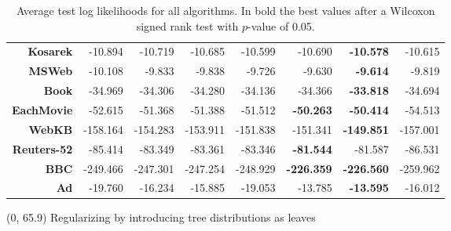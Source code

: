 \documentclass[final]{beamer}
\begin{document}
\begin{frame}{}
\begin{textblock}{25.2}
\begin{table}[!htbp]
\begin{tabular}{r r r r r r r r}
          \textbf{Kosarek}    & -10.894           & -10.719        & -10.685         & -10.599          & -10.690           & \textbf{-10.578}  & -10.615          \\
          \textbf{MSWeb}      & -10.108           & -9.833         & -9.838          & -9.726           & -9.630            & \textbf{-9.614}   & -9.819           \\
          \textbf{Book}       & -34.969           & -34.306        & -34.280         & -34.136          & -34.366           & \textbf{-33.818}  & -34.694          \\
          \textbf{EachMovie}  & -52.615           & -51.368        & -51.388         & -51.512          & \textbf{-50.263}  & \textbf{-50.414}  & -54.513          \\
          \textbf{WebKB}      & -158.164          & -154.283       & -153.911        & -151.838         & -151.341          & \textbf{-149.851} & -157.001         \\
          \textbf{Reuters-52} & -85.414           & -83.349        & -83.361         & -83.346          & \textbf{-81.544}  & -81.587           & -86.531          \\
          \textbf{BBC}        & -249.466          & -247.301       & -247.254        & -248.929         & \textbf{-226.359} & \textbf{-226.560} & -259.962         \\
          \textbf{Ad}         & -19.760           & -16.234        & -15.885         & -19.053          & -13.785           & \textbf{-13.595}  & -16.012          \\
          \bottomrule
        \end{tabular}
        \caption[Experimentation results]{\scriptsize Average test
          log likelihoods for all algorithms. In bold the best values
          after a Wilcoxon signed rank test with $p$-value of 0.05.}
        \label{tab:resexp}
      \end{table}   



      
      \end{textblock}


        
  \begin{textblock}{80}(0, 65.9)
    Regularizing by introducing tree distributions as leaves
  \end{textblock}
  

\end{frame}
\end{document}
